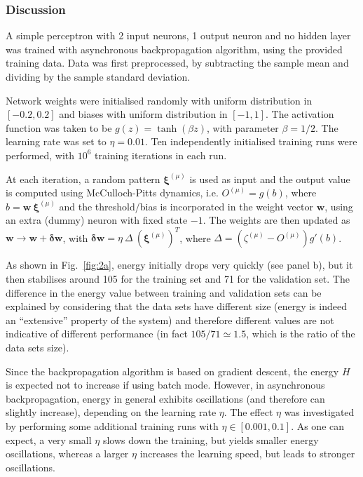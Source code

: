 \documentclass[12pt,titlepage]{article}
\begin{document}
\vspace*{-0.4cm}
\subsubsection*{Discussion}
\vspace*{-0.3cm}
A simple perceptron with 2 input neurons, 1 output neuron and no hidden layer was trained with asynchronous backpropagation algorithm, using the provided training data. Data was first preprocessed, by subtracting the sample mean and dividing by the sample standard deviation.

Network weights were initialised randomly with uniform distribution in $[-0.2, 0.2]$ and biases with uniform distribution in $[-1, 1]$. The activation function was taken to be $g(z) = \tanh(\beta z)$, with parameter $\beta = 1/2$. The learning rate was set to $\eta = 0.01$. Ten independently initialised training runs were performed, with $10^6$ training iterations in each run.

At each iteration, a random pattern $\bm{\xi}^{(\mu)}$ is used as input and the output value is computed using McCulloch-Pitts dynamics, i.e. $O^{(\mu)} = g(b)$, where $b = \bm{w} \ \bm{\xi}^{(\mu)}$ and the threshold/bias is incorporated in the weight vector $\bm{w}$, using an extra (dummy) neuron with fixed state $-1$. The weights are then updated as $\bm{w} \rightarrow \bm{w}+ \bm{\delta w}$, with $\bm{\delta w} = \eta \ \Delta \ (\bm{\xi}^{(\mu)})^T$, where $\Delta = (\zeta^{(\mu)} - O^{(\mu)}) g'(b)$.

As shown in Fig.~\ref{fig:2a}, energy initially drops very quickly (see panel b), but it then stabilises around 105 for the training set and 71 for the validation set. The difference in the energy value between training and validation sets can be explained by considering that the data sets have different size (energy is indeed an ``extensive'' property of the system) and therefore different values are not indicative of different performance (in fact $105/71 \simeq 1.5$, which is the ratio of the data sets size).

Since the backpropagation algorithm is based on gradient descent, the energy $H$ is expected not to increase if using batch mode. However, in asynchronous backpropagation, energy in general exhibits oscillations (and therefore can slightly increase), depending on the learning rate $\eta$. The effect $\eta$ was investigated by performing some additional training runs with ${\eta \in [0.001, 0.1]}$. As one can expect, a very small $\eta$ slows down the training, but yields smaller energy oscillations, whereas a larger $\eta$ increases the learning speed, but leads to stronger oscillations. 
\end{document}
